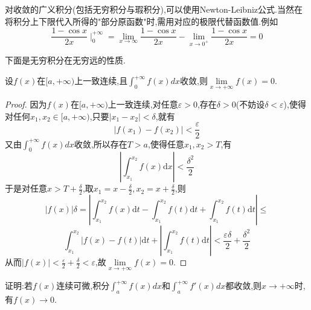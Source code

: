 \begin{note}
	对收敛的广义积分(包括无穷积分与瑕积分),可以使用Newton-Leibniz公式.当然在将积分上下限代入所得的"部分原函数"时,需用对应的极限代替函数值.例如
	$$
		\frac{1-\cos x}{2x}\mid_{0}^{+\infty}=\lim_{x\rightarrow \infty}\frac{1-\cos x}{2x}-\lim_{x\rightarrow 0^+}\frac{1-\cos x}{2x}=0
	$$
\end{note}

下面是无穷积分在无穷远的性质.

\begin{example}
	设$f(x)$在$[a,+\infty)$上一致连续,且$
		\int_0^{+\infty}{f\left( x \right) dx}
	$收敛,则$
		\lim\limits_{x\rightarrow +\infty}f\left( x \right) =0
	$.
\end{example}

\begin{proof}
	因为$f(x)$在$[a,+\infty)$上一致连续,对任意$\varepsilon >0$,存在$\delta >0$(不妨设$\delta < \varepsilon$),使得对任何$x_1,x_2 \in [a,+\infty)$,只要$|x_1-x_2|<\delta$,就有
	$$
		\left| f\left( x_1 \right) -f\left( x_2 \right) \right|<\frac{\varepsilon}{2}
	$$
	又由$
		\int_0^{+\infty}{f\left( x \right) dx}
	$收敛,所以存在$T>a$,使得任意$x_1,x_2>T$,有$$
		\left| \int_{x_1}^{x_2}{f\left( x \right) \text{d}x} \right|<\frac{\delta ^2}{2}
	$$
	于是对任意$x>T+\frac{\delta}{2}$,取$x_1=x-\frac{\delta}{2},x_2=x+\frac{\delta}{2}$,则
	$$
		\left| f\left( x \right) \right|\delta =\left| \int_{x_1}^{x_2}{f\left( x \right) \text{d}t}-\int_{x_1}^{x_2}{f\left( t \right) \text{d}t}+\int_{x_1}^{x_2}{f\left( t \right) \text{d}t} \right|\le
	$$
	$$
		\int_{x_1}^{x_2}{\left| f\left( x \right) -f\left( t \right) \right|\text{d}t+\left| \int_{x_1}^{x_2}{f\left( t \right) \text{d}t} \right|}<\frac{\varepsilon \delta}{2}+\frac{\delta ^2}{2}
	$$
	从而$
		\left| f\left( x \right) \right|<\frac{\varepsilon}{2}+\frac{\delta}{2}<\varepsilon
	$,故$
		\lim\limits_{x\rightarrow +\infty}f\left( x \right) =0
	$.
\end{proof}

\begin{example}
	证明:若$f(x)$连续可微,积分$
		\int_a^{+\infty}{f\left( x \right) dx}
	$和$
		\int_a^{+\infty}{f'\left( x \right) dx}
	$都收敛,则$x \rightarrow +\infty$时,有$f(x) \rightarrow 0$.
\end{example}

